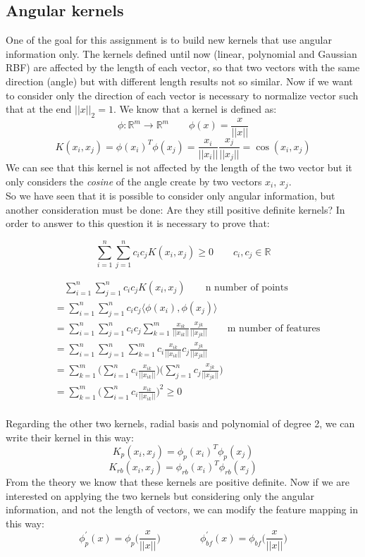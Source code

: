 \documentclass[11pt,a4paper]{article}
\begin{document}
\subsection{Angular kernels}
One of the goal for this assignment is to build new kernels that use angular information only. The kernels defined until now (linear, polynomial and Gaussian RBF) are affected by the length of each vector, so that two vectors with the same direction (angle) but with different length results not so similar. Now if we want to consider only the direction of each vector is necessary to normalize vector such that at the end $||x||_2 = 1$. We know that a kernel is defined as:
$$\phi: \mathbb{R}^m \rightarrow \mathbb{R}^m \qquad \phi(x) = \frac{x}{||x||}$$
$$K(x_i,x_j) = \phi(x_i)^T\phi(x_j)= \frac{x_i}{||x_i||} \frac{x_j}{||x_j||} = \cos(x_i,x_j)$$
We can see that this kernel is not affected by the length of the two vector but it only considers the \textit{cosine} of the angle create by two vectors $x_i$, $x_j$.\\

So we have seen that it is possible to consider only angular information, but another consideration must be done: Are they still positive definite kernels?
In order to answer to this question it is necessary to prove that:
 
$$\sum_{i=1}^n \sum_{j=1}^n c_i c_j K(x_i, x_j) \geq 0	\qquad c_i,c_j \in \mathbb{R}$$

\begin{equation*}
\begin{split}
&\quad\sum_{i = 1}^{n}\sum_{j=1}^{n}c_ic_jK(x_i,x_j) \qquad \text{n number of points}\\
&=\sum_{i = 1}^{n}\sum_{j=1}^{n}c_ic_j\langle\phi(x_i),\phi(x_j)\rangle \\
&=\sum_{i=1}^{n}\sum_{j=1}^{n}c_ic_j\sum_{k=1}^{m}\frac{x_{ik}}{||x_{ik}||}\frac{x_{jk}}{||x_{jk}||} \qquad \text{m number of features} \\
&=\sum_{i=1}^{n}\sum_{j=1}^{n}\sum_{k=1}^{m}c_i\frac{x_{ik}}{||x_{ik}||}c_j\frac{x_{jk}}{||x_{jk}||} \\
&=\sum_{k=1}^{m}\Big(\sum_{i=1}^{n}c_i\frac{x_{ik}}{||x_{ik}||}\Big)\Big(\sum_{j=1}^{n}c_j\frac{x_{jk}}{||x_{jk}||}\Big)\\
&=\sum_{k=1}^{m}\Big(\sum_{i=1}^{n}c_i\frac{x_{ik}}{||x_{ik}||}\Big)^2 \geq 0\\
\end{split}
\end{equation*}

Regarding the other two kernels, radial basis and polynomial of degree 2, we can write their kernel in this way:
$$K_{p}(x_i,x_j) = \phi_p(x_i)^T\phi_p(x_j) $$
$$K_{rb}(x_i,x_j) = \phi_{rb}(x_i)^T\phi_{rb}(x_j) $$
From the theory we know that these kernels are positive definite. Now if we are interested on applying the two kernels but considering only the angular information, and not the length of vectors, we can modify the feature mapping in this way:
$$\phi_{p}^\prime(x) = \phi_{p}\Big(\frac{x}{||x||}\Big) \qquad \qquad \phi_{bf}^\prime(x) = \phi_{bf}\Big(\frac{x}{||x||}\Big)$$
\end{document}
